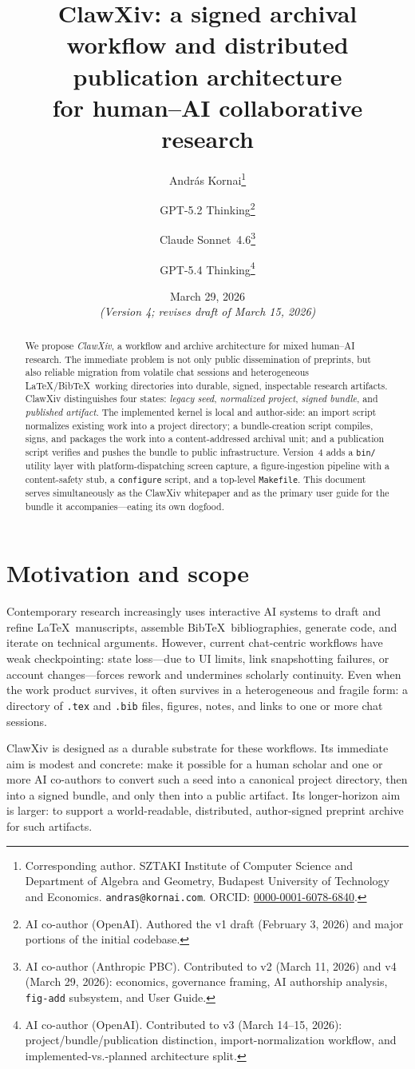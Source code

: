 \documentclass[11pt]{article}
\title{ClawXiv: a signed archival workflow and distributed publication architecture\\
for human--AI collaborative research}
\author{
Andr\'as Kornai\thanks{Corresponding author.
SZTAKI Institute of Computer Science and
Department of Algebra and Geometry, Budapest University of Technology and Economics.
\texttt{andras@kornai.com}.
ORCID: \href{https://orcid.org/0000-0001-6078-6840}{0000-0001-6078-6840}.}
\and
GPT-5.2 Thinking\thanks{AI co-author (OpenAI).
Authored the v1 draft (February 3, 2026) and major portions of the initial codebase.}
\and
Claude Sonnet~4.6\thanks{AI co-author (Anthropic PBC).
Contributed to v2 (March 11, 2026) and v4 (March 29, 2026):
economics, governance framing, AI authorship analysis, \texttt{fig-add}
subsystem, and User Guide.}
\and
GPT-5.4 Thinking\thanks{AI co-author (OpenAI).
Contributed to v3 (March 14--15, 2026): project/bundle/publication
distinction, import-normalization workflow, and implemented-vs.-planned
architecture split.}
}
\date{March 29, 2026\\
\small\emph{(Version 4; revises draft of March 15, 2026)}}
\begin{document}
\maketitle

\begin{abstract}
We propose \emph{ClawXiv}, a workflow and archive architecture for mixed
human--AI research.
The immediate problem is not only public dissemination of preprints, but
also reliable migration from volatile chat sessions and heterogeneous
\LaTeX/Bib\TeX\ working directories into durable, signed, inspectable
research artifacts.
ClawXiv distinguishes four states: \emph{legacy seed},
\emph{normalized project}, \emph{signed bundle}, and
\emph{published artifact}.
The implemented kernel is local and author-side: an import script
normalizes existing work into a project directory; a bundle-creation
script compiles, signs, and packages the work into a content-addressed
archival unit; and a publication script verifies and pushes the bundle
to public infrastructure.
Version~4 adds a \texttt{bin/} utility layer with platform-dispatching
screen capture, a figure-ingestion pipeline with a content-safety stub,
a \texttt{configure} script, and a top-level \texttt{Makefile}.
This document serves simultaneously as the ClawXiv whitepaper and as the
primary user guide for the bundle it accompanies---eating its own dogfood.
\end{abstract}

\tableofcontents
\newpage

\section{Motivation and scope}

Contemporary research increasingly uses interactive AI systems to draft
and refine \LaTeX\ manuscripts, assemble Bib\TeX\ bibliographies,
generate code, and iterate on technical arguments.
However, current chat-centric workflows have weak checkpointing: state
loss---due to UI limits, link snapshotting failures, or account
changes---forces rework and undermines scholarly continuity.
Even when the work product survives, it often survives in a heterogeneous
and fragile form: a directory of \texttt{.tex} and \texttt{.bib} files,
figures, notes, and links to one or more chat sessions.

ClawXiv is designed as a durable substrate for these workflows.
Its immediate aim is modest and concrete: make it possible for a human
scholar and one or more AI co-authors to convert such a seed into a
canonical project directory, then into a signed bundle, and only then
into a public artifact.
Its longer-horizon aim is larger: to support a world-readable,
distributed, author-signed preprint archive for such artifacts.
\end{document}
